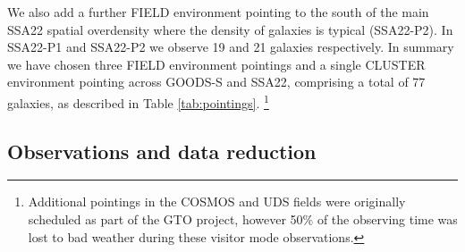 \documentclass[fleqn,usenatbib]{mn2e}
\begin{document}
We also add a further FIELD environment pointing to the south of the main SSA22 spatial overdensity where the density of galaxies is typical (SSA22-P2).
In SSA22-P1 and SSA22-P2 we observe 19 and 21 galaxies respectively.
In summary we have chosen three FIELD environment pointings and a single CLUSTER environment pointing across GOODS-S and SSA22, comprising a total of 77 galaxies, as described in Table \ref{tab:pointings}. \footnote{Additional pointings in the COSMOS and UDS fields were originally scheduled as part of the GTO project, however 50$\%$ of the observing time was lost to bad weather during these visitor mode observations.}

\subsection{Observations and data reduction}\label{subsubsec:observations_and_dr}
\end{document}
